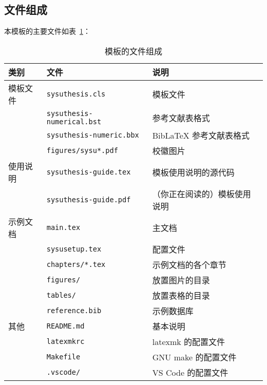\documentclass[a4paper]{ltxdoc}
\DeclareRobustCommand\file{\nolinkurl}
\begin{document}
\subsection{文件组成}
本模板的主要文件如表~\ref{tab:files}：
\begin{table}[htb]
  \centering\small
  \caption{模板的文件组成}
  \label{tab:files}
  \begin{tabular}{lll}
    \toprule
    类别     & 文件                      & 说明                         \\
    \midrule
    模板文件 & \file{sysuthesis.cls}     & 模板文件                     \\
             & \file{sysuthesis-numerical.bst}   & \BibTeX{} 参考文献表格式   \\
             & \file{sysuthesis-numeric.bbx}    & BibLaTeX 参考文献表格式  \\
             & \file{figures/sysu*.pdf} & 校徽图片               \\
    \midrule
    使用说明 & \file{sysuthesis-guide.tex} & 模板使用说明的源代码         \\
             & \file{sysuthesis-guide.pdf} & （你正在阅读的）模板使用说明 \\
    \midrule
    示例文档 & \file{main.tex}           & 主文档                       \\
             & \file{sysusetup.tex}      & 配置文件                     \\
             & \file{chapters/*.tex}     & 示例文档的各个章节           \\
             & \file{figures/}           & 放置图片的目录               \\
             & \file{tables/}            & 放置表格的目录               \\
             & \file{reference.bib}       & \BibTeX{} 示例数据库         \\
    \midrule
    其他     & \file{README.md}          & 基本说明                     \\
             & \file{latexmkrc}          & latexmk 的配置文件           \\
             & \file{Makefile}           & GNU make 的配置文件          \\
             & \file{.vscode/}           & VS Code 的配置文件           \\
    \bottomrule
  \end{tabular}
\end{table}
\end{document}
